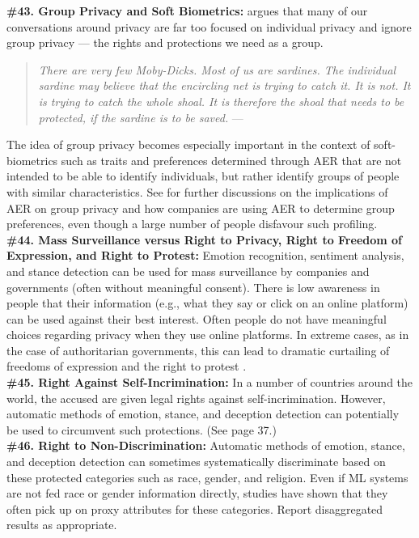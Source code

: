 \documentclass{clv3}
\begin{document}
\noindent \textbf{\#43. Group Privacy and Soft Biometrics:} \citet{floridi2014open} argues that many of our conversations around privacy are far too focused on individual privacy and ignore group privacy — the rights and protections we need as a group.\\[-20pt]
\begin{quote}
    \textit{There are very few Moby-Dicks. Most of us are sardines. The individual sardine may believe that the encircling net is trying to catch it. It is not. It is trying to catch the whole shoal. It is therefore the shoal that needs to be protected, if the sardine is to be saved.} — \citet{floridi2014open}
\end{quote}
\vspace*{-3mm}
\noindent The idea of group privacy becomes especially important in the context of soft-biometrics such as traits and preferences determined through AER that are not intended to be able to identify individuals, but rather identify groups of people with similar characteristics. See \citet{mcstay2020emotional} for further discussions on the implications of AER on group privacy and how companies are using AER to determine group preferences, even though a large number of people disfavour such profiling.\\

\noindent \textbf{\#44. Mass Surveillance versus Right to Privacy, Right to Freedom of Expression, and Right to Protest:} Emotion recognition, sentiment analysis, and stance detection can be used for mass surveillance by companies and governments (often without meaningful consent). There is low awareness in people that their information (e.g., what they say or click on an online platform) can be used against their best interest. Often people do not have meaningful choices regarding privacy when they use online platforms.
In extreme cases, as in the case of authoritarian governments, this can lead to dramatic curtailing of freedoms of expression and the right to protest \cite{article19_2021,wakefield_2021}.\\

\noindent \textbf{\#45. Right Against Self-Incrimination:} In a number of countries around the world, the accused are given legal rights against self-incrimination. However, automatic methods of emotion, stance, and deception detection can potentially be used to circumvent such protections. (See \citet{article19_2021} page 37.)\\

\noindent \textbf{\#46. Right to Non-Discrimination:} 
Automatic methods of emotion, stance, and deception detection can sometimes systematically discriminate based on these protected categories such as race, gender, and religion. Even if ML systems are not fed race or gender information directly, studies have shown that they often pick up on proxy attributes for these categories. Report disaggregated results as appropriate.\\[2pt]
\end{document}
